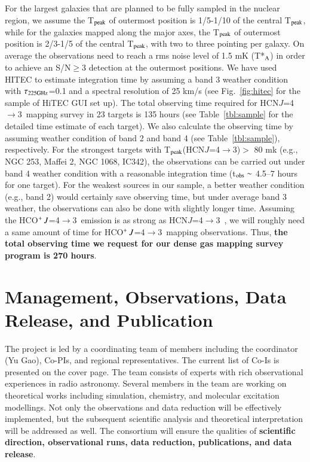 \documentclass[legal,11pt]{article}
\def\,{\thinspace}
\def\HCNft        {HCN\,$J$=4$\rightarrow$3}
\def\HCOPft     {HCO$^+\,J$=4$\rightarrow$3}
\begin{document}
For the largest galaxies that are planned to be fully sampled in the nuclear
region, we assume the T$_{\rm peak}$ of outermost position is 1/5-1/10 of the
central T$_{\rm peak}$, while for the galaxies mapped along the major axes, the
T$_{\rm peak}$ of outermost position is 2/3-1/5 of the central T$_{\rm peak}$,
with two to three pointing per galaxy.  On average the observations need to
reach a rms noise level of 1.5 mK (T*$_{\rm A}$) in order to achieve an
S/N$\geq$3 detection at the outermost positions. We have used HITEC to estimate
integration time by assuming a band 3 weather condition with $\tau_{\rm
225GHz}$=0.1 and a spectral resolution of 25 km/s (see Fig.~\ref{fig:hitec} for
the sample of HiTEC GUI set up). The total observing time required for \HCNft\
mapping survey in 23 targets is 135 hours (see Table~\ref{tbl:sample} for the
detailed time estimate of each target).  We also calculate the observing time
by assuming weather condition of band 2 and band 4 (see
Table~\ref{tbl:sample}), respectively. For the strongest targets with T$_{\rm
peak}$(\HCNft)$>$ 80 mk (e.g., NGC 253, Maffei 2, NGC 1068, IC342),  the
observations can be carried out under band 4 weather condition with a
reasonable integration time (t$_{\rm obs}\sim$ 4.5--7 hours for one target).
For the weakest sources in our sample, a better weather condition (e.g., band
2) would certainly save observing time, but under average band 3 weather, the
observations can also be done with slightly longer time.  Assuming the \HCOPft\
emission is as strong as \HCNft\ \citep[see][]{zgh2014}, we will roughly need a
same amount of time for \HCOPft\ mapping observations.  Thus, {\bf the total
observing time we request for our dense gas mapping survey program is 270
hours}.



\section{Management, Observations, Data Release, and Publication } 


The project is led by a coordinating team of members including the coordinator
(Yu Gao), Co-PIs, and regional representatives. The current list of Co-Is is
presented on the cover page. The team consists of experts with rich
observational experiences in radio astronomy.  Several members in the team are
working on theoretical works including simulation, chemistry, and molecular
excitation modellings. Not only the observations and data reduction will be
effectively implemented, but the subsequent scientific analysis and theoretical
interpretation will be addressed as well.  The consortium will ensure the
qualities of {\bf scientific direction, observational runs, data reduction,
publications, and data release}. 
\end{document}
